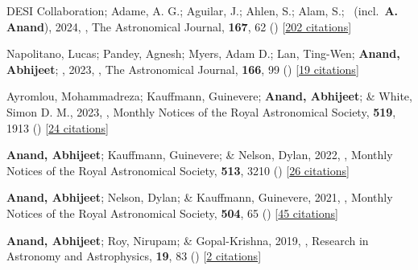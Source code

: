 \item[{\color{numcolor}\scriptsize6}] DESI Collaboration; Adame, A. G.; Aguilar, J.; Ahlen, S.; Alam, S.; \etal\ (incl.\ \textbf{A. Anand}), 2024, , The Astronomical Journal, \textbf{167}, 62 () [\href{https://ui.adsabs.harvard.edu/abs/2024AJ....167...62D}{202 citations}]

\item[{\color{numcolor}\scriptsize5}] Napolitano, Lucas; Pandey, Agnesh; Myers, Adam D.; Lan, Ting-Wen; \textbf{Anand, Abhijeet}; \etal, 2023, , The Astronomical Journal, \textbf{166}, 99 () [\href{https://ui.adsabs.harvard.edu/abs/2023AJ....166...99N}{19 citations}]

\item[{\color{numcolor}\scriptsize4}] Ayromlou, Mohammadreza; Kauffmann, Guinevere; \textbf{Anand, Abhijeet}; \& White, Simon D. M., 2023, , Monthly Notices of the Royal Astronomical Society, \textbf{519}, 1913 () [\href{https://ui.adsabs.harvard.edu/abs/2023MNRAS.519.1913A}{24 citations}]

\item[{\color{numcolor}\scriptsize3}] \textbf{Anand, Abhijeet}; Kauffmann, Guinevere; \& Nelson, Dylan, 2022, , Monthly Notices of the Royal Astronomical Society, \textbf{513}, 3210 () [\href{https://ui.adsabs.harvard.edu/abs/2022MNRAS.513.3210A}{26 citations}]

\item[{\color{numcolor}\scriptsize2}] \textbf{Anand, Abhijeet}; Nelson, Dylan; \& Kauffmann, Guinevere, 2021, , Monthly Notices of the Royal Astronomical Society, \textbf{504}, 65 () [\href{https://ui.adsabs.harvard.edu/abs/2021MNRAS.504...65A}{45 citations}]

\item[{\color{numcolor}\scriptsize1}] \textbf{Anand, Abhijeet}; Roy, Nirupam; \& Gopal-Krishna, 2019, , Research in Astronomy and Astrophysics, \textbf{19}, 83 () [\href{https://ui.adsabs.harvard.edu/abs/2019RAA....19...83A}{2 citations}]